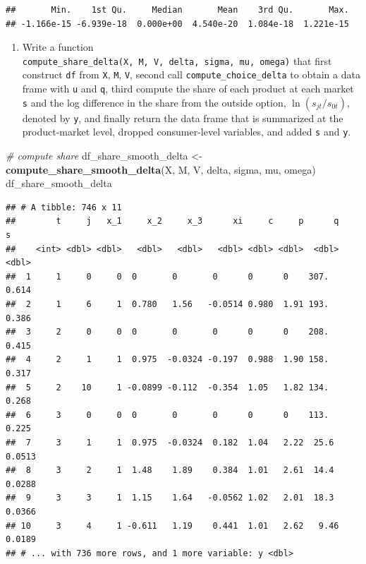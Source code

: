 \documentclass[]{book}
\newenvironment{Shaded}{\begin{snugshade}}{\end{snugshade}}
\newcommand{\KeywordTok}[1]{\textcolor[rgb]{0.13,0.29,0.53}{\textbf{#1}}}
\newcommand{\StringTok}[1]{\textcolor[rgb]{0.31,0.60,0.02}{#1}}
\newcommand{\CommentTok}[1]{\textcolor[rgb]{0.56,0.35,0.01}{\textit{#1}}}
\newcommand{\NormalTok}[1]{#1}
\providecommand{\tightlist}{%
  \setlength{\itemsep}{0pt}\setlength{\parskip}{0pt}}
\begin{document}
\begin{verbatim}
##       Min.    1st Qu.     Median       Mean    3rd Qu.       Max. 
## -1.166e-15 -6.939e-18  0.000e+00  4.540e-20  1.084e-18  1.221e-15
\end{verbatim}

\begin{enumerate}
\def\labelenumi{\arabic{enumi}.}
\setcounter{enumi}{6}
\tightlist
\item
  Write a function
  \texttt{compute\_share\_delta(X,\ M,\ V,\ delta,\ sigma,\ mu,\ omega)}
  that first construct \texttt{df} from \texttt{X}, \texttt{M},
  \texttt{V}, second call \texttt{compute\_choice\_delta} to obtain a
  data frame with \texttt{u} and \texttt{q}, third compute the share of
  each product at each market \texttt{s} and the log difference in the
  share from the outside option, \(\ln(s_{jt}/s_{0t})\), denoted by
  \texttt{y}, and finally return the data frame that is summarized at
  the product-market level, dropped consumer-level variables, and added
  \texttt{s} and \texttt{y}.
\end{enumerate}

\begin{Shaded}
\begin{Highlighting}[]
\CommentTok{# compute share}
\NormalTok{df_share_smooth_delta <-}
\StringTok{  }\KeywordTok{compute_share_smooth_delta}\NormalTok{(X, M, V, delta, sigma, mu, omega) }
\NormalTok{df_share_smooth_delta}
\end{Highlighting}
\end{Shaded}

\begin{verbatim}
## # A tibble: 746 x 11
##        t     j   x_1     x_2     x_3      xi     c     p      q      s
##    <int> <dbl> <dbl>   <dbl>   <dbl>   <dbl> <dbl> <dbl>  <dbl>  <dbl>
##  1     1     0     0  0       0       0      0      0    307.   0.614 
##  2     1     6     1  0.780   1.56   -0.0514 0.980  1.91 193.   0.386 
##  3     2     0     0  0       0       0      0      0    208.   0.415 
##  4     2     1     1  0.975  -0.0324 -0.197  0.988  1.90 158.   0.317 
##  5     2    10     1 -0.0899 -0.112  -0.354  1.05   1.82 134.   0.268 
##  6     3     0     0  0       0       0      0      0    113.   0.225 
##  7     3     1     1  0.975  -0.0324  0.182  1.04   2.22  25.6  0.0513
##  8     3     2     1  1.48    1.89    0.384  1.01   2.61  14.4  0.0288
##  9     3     3     1  1.15    1.64   -0.0562 1.02   2.01  18.3  0.0366
## 10     3     4     1 -0.611   1.19    0.441  1.01   2.62   9.46 0.0189
## # ... with 736 more rows, and 1 more variable: y <dbl>
\end{verbatim}
\end{document}

